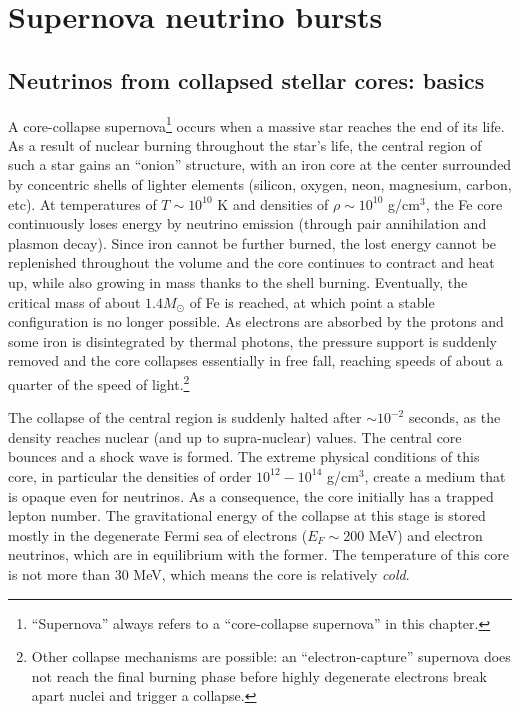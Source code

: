 \section{Supernova neutrino bursts}
\label{sec:snb-lowe-snb}




\subsection{Neutrinos from collapsed stellar cores: basics}

A core-collapse supernova\footnote{``Supernova'' always
  refers to a ``core-collapse supernova'' in this chapter.} occurs when a massive star reaches the end of its
life. As a result of nuclear burning throughout the star's life, the
central region of such a star gains an ``onion'' structure, with an iron core at the center surrounded by concentric shells of lighter elements (silicon, oxygen, neon, magnesium, carbon, etc). At temperatures of $T\sim 10^{10}$ K and densities of $\rho \sim 10^{10}$ g/cm$^{3}$, the Fe core continuously loses energy by neutrino emission (through pair annihilation and plasmon decay). Since iron cannot be further burned, the lost energy cannot be replenished throughout the volume and the core continues to contract and heat up, while also growing in mass thanks to the shell burning. Eventually, the critical mass of about $1.4 M_{\odot}$ of Fe is reached, at which point a stable configuration is no longer possible. As electrons are absorbed by the protons and some iron is disintegrated by thermal photons, the pressure support is suddenly removed and the core collapses essentially in free fall, reaching speeds of about a quarter of the speed of light.\footnote{Other collapse mechanisms are possible: an ``electron-capture'' supernova does not reach the final burning phase before highly degenerate electrons break apart nuclei and trigger a collapse.}

The collapse of the central region is suddenly halted after $\sim 10^{-2}$ seconds, as the density reaches nuclear (and up to supra-nuclear)  values. The central core bounces and a shock wave is formed. The extreme physical conditions of this core, in particular the densities of order $10^{12}-10^{14}$ g/cm$^{3}$, create a medium that is opaque even for neutrinos. As a consequence, the core initially has a trapped lepton number. The gravitational energy of the collapse at this stage is stored mostly in the degenerate Fermi sea of electrons ($E_{F}\sim 200$ MeV) and electron neutrinos, which are in equilibrium with the former. The temperature of this core is not more than 30 MeV, which means the core is relatively \emph{cold}. 

